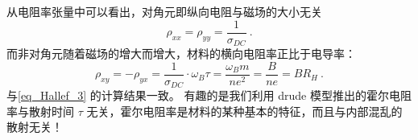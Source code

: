 从电阻率张量中可以看出，对角元即纵向电阻与磁场的大小无关
\begin{equation}
\rho_{xx}=\rho_{yy}=\frac{1}{\sigma_{DC}} ~.
\end{equation}
而非对角元随着磁场的增大而增大，材料的横向电阻率正比于电导率：
\begin{equation}
\rho_{xy}=-\rho_{yx} = \frac{1}{\sigma_{DC}}\cdot \omega_B\tau=\frac{\omega_B m}{ne^2}=\frac{B}{ne}=BR_H~.
\end{equation}
与\autoref{eq_Hallef_3} 的计算结果一致。
有趣的是我们利用 drude 模型推出的霍尔电阻率与散射时间 $\tau$ 无关，霍尔电阻率是材料的某种基本的特征，而且与内部混乱的散射无关！
